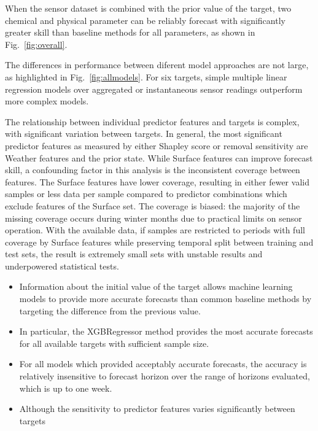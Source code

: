 \documentclass[resources,article,submit,pdftex,moreauthors]{Definitions/mdpi}
\begin{document}
When the sensor dataset is combined with the prior value of the target, two chemical and physical parameter can be reliably forecast with significantly greater skill than baseline methods for all parameters, as shown in Fig.~\ref{fig:overall}.

The differences in performance between diferent model approaches are not large, as highlighted in Fig.~\ref{fig:allmodels}. For six targets, simple multiple linear regression models over aggregated or instantaneous sensor readings outperform more complex models.

The relationship between individual predictor features and targets is complex, with significant variation between targets. In general, the most significant predictor features as measured by either Shapley score or removal sensitivity are Weather features and the prior state. While Surface features can improve forecast skill, a confounding factor in this analysis is the inconsistent coverage between features. The Surface features have lower coverage, resulting in either fewer valid samples or less data per sample compared to predictor combinations which exclude features of the Surface set. The coverage is biased: the majority of the missing coverage occurs during winter months due to practical limits on sensor operation. With the available data, if samples are restricted to periods with full coverage by Surface features while preserving temporal split between training and test sets, the result is extremely small sets with unstable results and underpowered statistical tests.


\begin{itemize}
    \item Information about the initial value of the target allows machine learning models to provide more accurate forecasts than common baseline methods by targeting the difference from the previous value.
    \item In particular, the XGBRegressor method provides the most accurate forecasts for all available targets with sufficient sample size.
    \item For all models which provided acceptably accurate forecasts, the accuracy is relatively insensitive to forecast horizon over the range of horizons evaluated, which is up to one week. 
    \item Although the sensitivity to predictor features varies significantly between targets
\end{itemize}
\end{document}
